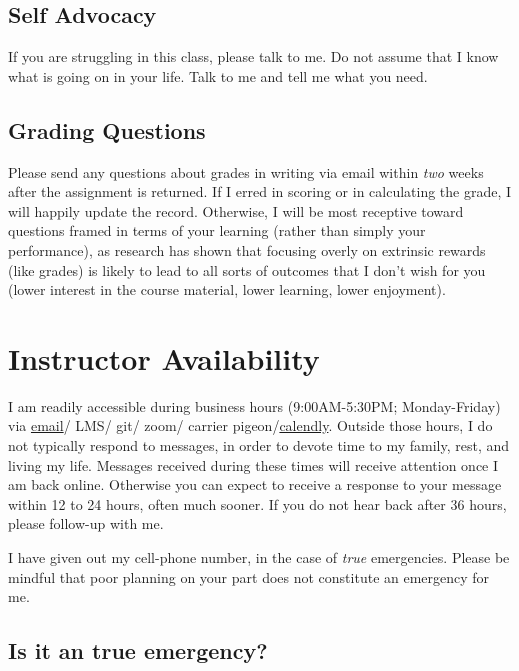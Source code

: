 \hypertarget{self-advocacy-1}{%
\subsection{Self Advocacy}\label{self-advocacy-1}}

If you are struggling in this class, please talk to me. Do not assume that I know what is going on in your life. Talk to me and tell me what you need.

\hypertarget{grading-questions}{%
\subsection{Grading Questions}\label{grading-questions}}

Please send any questions about grades in writing via email within \emph{two} weeks after the assignment is returned. If I erred in scoring or in calculating the grade, I will happily update the record. Otherwise, I will be most receptive toward questions framed in terms of your learning (rather than simply your performance), as research has shown that focusing overly on extrinsic rewards (like grades) is likely to lead to all sorts of outcomes that I don't wish for you (lower interest in the course material, lower learning, lower enjoyment).

\hypertarget{instructor-availability}{%
\section{Instructor Availability}\label{instructor-availability}}

I am readily accessible during business hours (9:00AM-5:30PM; Monday-Friday) via \href{garrissm@wfu.edu}{email}/ LMS/ git/ zoom/ carrier pigeon/\href{https://calendly.com/smasongarrison/}{calendly}. Outside those hours, I do not typically respond to messages, in order to devote time to my family, rest, and living my life. Messages received during these times will receive attention once I am back online. Otherwise you can expect to receive a response to your message within 12 to 24 hours, often much sooner. If you do not hear back after 36 hours, please follow-up with me.

I have given out my cell-phone number, in the case of \emph{true} emergencies. Please be mindful that poor planning on your part does not constitute an emergency for me.

\hypertarget{is-it-an-true-emergency}{%
\subsection{Is it an true emergency?}\label{is-it-an-true-emergency}}

